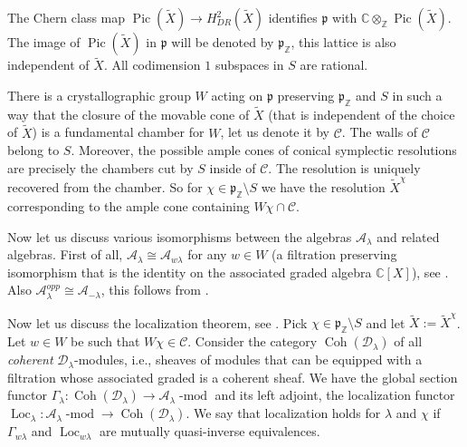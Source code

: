 \documentclass[12pt]{amsart}
\newcommand{\A}{\mathcal{A}}
\newcommand{\K}{\mathbb{C}}
\newcommand{\Z}{\mathbb{Z}}
\newcommand{\C}{\mathbb{C}}
\newcommand{\Loc}{\operatorname{Loc}}
\newcommand{\param}{\mathfrak{p}}
\theoremstyle{definition}
\begin{document}
The Chern class map $\operatorname{Pic}(\tilde{X})\rightarrow H^2_{DR}(\tilde{X})$  identifies
$\param$ with $\K\otimes_{\Z}\operatorname{Pic}(\tilde{X})$. The image of $\operatorname{Pic}(\tilde{X})$
in $\param$ will be denoted by $\param_{\Z}$, this lattice is also independent of $\tilde{X}$. All codimension $1$ subspaces in $S$ are  rational.

There is a crystallographic group $W$ acting on $\param$ preserving $\param_{\Z}$ and $S$
in such a way that the closure of the movable cone
of $\tilde{X}$ (that is independent of the choice of $\tilde{X}$) is a fundamental chamber for $W$, let us denote it by $\mathcal{C}$. The walls of $\mathcal{C}$ belong to $S$. Moreover, the possible ample cones of conical symplectic resolutions are precisely the chambers cut by $S$ inside of $\mathcal{C}$. The resolution is uniquely recovered
from the chamber.  So for $\chi\in \param_{\Z}\setminus S$ we have the resolution
$\tilde{X}^{\chi}$ corresponding to the ample cone containing $W\chi\cap \mathcal{C}$.


Now let us discuss various isomorphisms between the algebras $\A_\lambda$ and related algebras.
First of all, $\A_\lambda\cong \A_{w\lambda}$ for any $w\in W$  (a filtration preserving isomorphism
that is the identity on the associated graded algebra $\C[X]$), see \cite[Section 3.3]{BPW}. Also
$\A_{\lambda}^{opp}\cong \A_{-\lambda}$, this follows from \cite[Section 2.3]{quant}.

Now let us discuss the localization theorem, see \cite[Section 5]{BPW}. Pick $\chi\in \param_{\Z}\setminus S$
and let $\tilde{X}:=\tilde{X}^\chi$. Let $w\in W$ be such that $W\chi\in \mathcal{C}$.
Consider the category $\operatorname{Coh}(\mathcal{D}_\lambda)$ of all {\it coherent}  $\mathcal{D}_\lambda$-modules,
i.e., sheaves of modules that can be equipped with a filtration whose associated graded is a
coherent sheaf. We have the global section functor $\Gamma_\lambda: \operatorname{Coh}(\mathcal{D}_\lambda)
\rightarrow \A_\lambda\operatorname{-mod}$ and its left adjoint, the localization functor
$\Loc_\lambda: \A_\lambda\operatorname{-mod}\rightarrow \operatorname{Coh}(\mathcal{D}_\lambda)$.
We say that localization holds for $\lambda$ and $\chi$ if $\Gamma_{w\lambda}$ and $\Loc_{w\lambda}$ are mutually
quasi-inverse equivalences.
\end{document}
